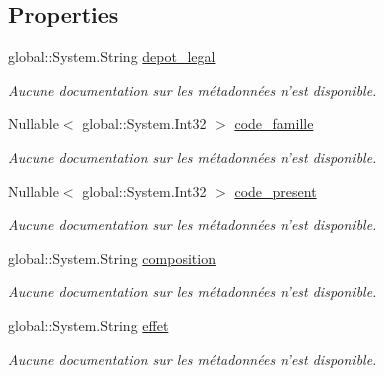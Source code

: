 \subsection*{Properties}
\begin{DoxyCompactItemize}
\item 
global\-::\-System.\-String \hyperlink{class_model_1_1_m_e_d_i_c_a_m_e_n_t_ad27c0736a77e2ac61cf5d94d7f0ddd00}{depot\-\_\-legal}
\begin{DoxyCompactList}\small\item\em Aucune documentation sur les métadonnées n'est disponible. \end{DoxyCompactList}\item 
Nullable$<$ global\-::\-System.\-Int32 $>$ \hyperlink{class_model_1_1_m_e_d_i_c_a_m_e_n_t_a39e97dd11fe652aaa6b30e80694694d3}{code\-\_\-famille}
\begin{DoxyCompactList}\small\item\em Aucune documentation sur les métadonnées n'est disponible. \end{DoxyCompactList}\item 
Nullable$<$ global\-::\-System.\-Int32 $>$ \hyperlink{class_model_1_1_m_e_d_i_c_a_m_e_n_t_a39501452dd03c0c20690e387a1e4e324}{code\-\_\-present}
\begin{DoxyCompactList}\small\item\em Aucune documentation sur les métadonnées n'est disponible. \end{DoxyCompactList}\item 
global\-::\-System.\-String \hyperlink{class_model_1_1_m_e_d_i_c_a_m_e_n_t_af047e823d0f57ffd36009d48ddae4a9c}{composition}
\begin{DoxyCompactList}\small\item\em Aucune documentation sur les métadonnées n'est disponible. \end{DoxyCompactList}\item 
global\-::\-System.\-String \hyperlink{class_model_1_1_m_e_d_i_c_a_m_e_n_t_ad94a543654340fa8b32a0f82996fb95b}{effet}
\begin{DoxyCompactList}\small\item\em Aucune documentation sur les métadonnées n'est disponible. \end{DoxyCompactList}\item 

\end{DoxyCompactItemize}

